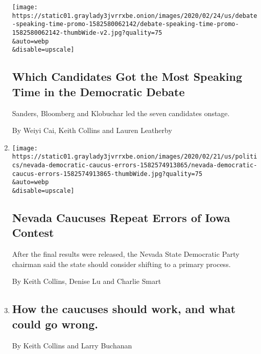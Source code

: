\begin{enumerate}
  \texttt{[image: https://static01.graylady3jvrrxbe.onion/images/2020/02/24/us/debate-speaking-time-promo-1582580062142/debate-speaking-time-promo-1582580062142-thumbWide-v2.jpg?quality=75\\\&auto=webp\\\&disable=upscale]}

  \hypertarget{which-candidates-got-the-most-speaking-time-in-the-democratic-debate}{%
  \subsection{Which Candidates Got the Most Speaking Time in the
  Democratic
  Debate}\label{which-candidates-got-the-most-speaking-time-in-the-democratic-debate}}

  Sanders, Bloomberg and Klobuchar led the seven candidates onstage.

  By Weiyi Cai, Keith Collins and Lauren Leatherby
\item
  \href{/interactive/2020/02/24/us/politics/nevada-democratic-caucus-errors.html}{}

  \texttt{[image: https://static01.graylady3jvrrxbe.onion/images/2020/02/21/us/politics/nevada-democratic-caucus-errors-1582574913865/nevada-democratic-caucus-errors-1582574913865-thumbWide.jpg?quality=75\\\&auto=webp\\\&disable=upscale]}

  \hypertarget{nevada-caucuses-repeat-errors-of-iowa-contest}{%
  \subsection{Nevada Caucuses Repeat Errors of Iowa
  Contest}\label{nevada-caucuses-repeat-errors-of-iowa-contest}}

  After the final results were released, the Nevada State Democratic
  Party chairman said the state should consider shifting to a primary
  process.

  By Keith Collins, Denise Lu and Charlie Smart
\item
  \href{/live/2020/nevada-caucus-02-22/how-caucuses-work}{}

  \hypertarget{how-the-caucuses-should-work-and-what-could-go-wrong}{%
  \subsection{How the caucuses should work, and what could go
  wrong.}\label{how-the-caucuses-should-work-and-what-could-go-wrong}}

  By Keith Collins and Larry Buchanan
\end{enumerate}

